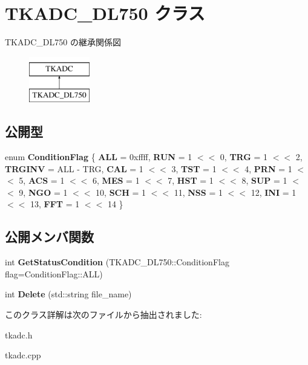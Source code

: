 \hypertarget{class_t_k_a_d_c___d_l750}{}\section{T\+K\+A\+D\+C\+\_\+\+D\+L750 クラス}
\label{class_t_k_a_d_c___d_l750}
T\+K\+A\+D\+C\+\_\+\+D\+L750 の継承関係図\begin{figure}[H]
\begin{center}
\leavevmode
\includegraphics[height=2.000000cm]{class_t_k_a_d_c___d_l750}
\end{center}
\end{figure}
\subsection*{公開型}
\begin{DoxyCompactItemize}
\item 
\mbox{\label{class_t_k_a_d_c___d_l750_ad5e6efe75dfb6d580542cc4843312c25}} 
enum {\bfseries Condition\+Flag} \{ \newline
{\bfseries A\+LL} = 0xffff, 
{\bfseries R\+UN} = 1 $<$$<$ 0, 
{\bfseries T\+RG} = 1 $<$$<$ 2, 
{\bfseries T\+R\+G\+I\+NV} = A\+LL -\/ T\+RG, 
\newline
{\bfseries C\+AL} = 1 $<$$<$ 3, 
{\bfseries T\+ST} = 1 $<$$<$ 4, 
{\bfseries P\+RN} = 1 $<$$<$ 5, 
{\bfseries A\+CS} = 1 $<$$<$ 6, 
\newline
{\bfseries M\+ES} = 1 $<$$<$ 7, 
{\bfseries H\+ST} = 1 $<$$<$ 8, 
{\bfseries S\+UP} = 1 $<$$<$ 9, 
{\bfseries N\+GO} = 1 $<$$<$ 10, 
\newline
{\bfseries S\+CH} = 1 $<$$<$ 11, 
{\bfseries N\+SS} = 1 $<$$<$ 12, 
{\bfseries I\+NI} = 1 $<$$<$ 13, 
{\bfseries F\+FT} = 1 $<$$<$ 14
 \}
\end{DoxyCompactItemize}
\subsection*{公開メンバ関数}
\begin{DoxyCompactItemize}
\item 
\mbox{\label{class_t_k_a_d_c___d_l750_a55a20539b69f9458422818a27ad08321}} 
int {\bfseries Get\+Status\+Condition} (T\+K\+A\+D\+C\+\_\+\+D\+L750\+::\+Condition\+Flag flag=Condition\+Flag\+::\+A\+LL)
\item 
\mbox{\label{class_t_k_a_d_c___d_l750_a7f1e774f28694761a8086797459c1b4f}} 
int {\bfseries Delete} (std\+::string file\+\_\+name)
\end{DoxyCompactItemize}


このクラス詳解は次のファイルから抽出されました\+:\begin{DoxyCompactItemize}
\item 
tkadc.\+h\item 
tkadc.\+cpp\end{DoxyCompactItemize}
